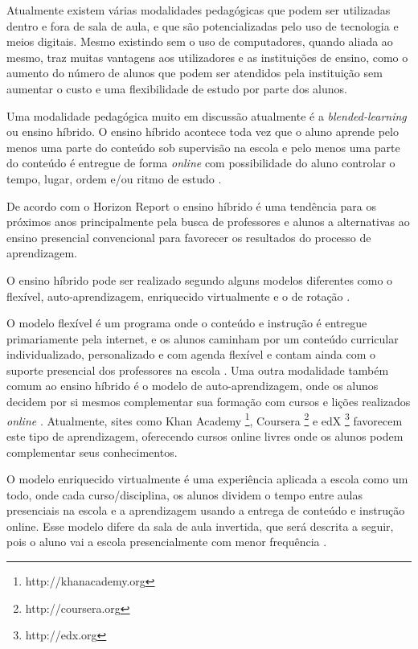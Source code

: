 Atualmente existem várias modalidades pedagógicas que podem ser utilizadas dentro e fora de sala de aula, e que são potencializadas pelo uso de tecnologia e meios digitais. Mesmo existindo sem o uso de computadores, quando aliada ao mesmo, traz muitas vantagens aos utilizadores e as instituições de ensino, como o aumento do número de alunos que podem ser atendidos pela instituição sem aumentar o custo e uma flexibilidade de estudo por parte dos alunos. 

Uma modalidade pedagógica muito em discussão atualmente é a \emph{blended-learning} ou ensino híbrido. O ensino híbrido acontece toda vez que o aluno aprende pelo menos uma parte do conteúdo sob supervisão na escola e pelo menos uma parte do conteúdo é entregue de forma \emph{online} com possibilidade do aluno controlar o tempo, lugar, ordem e/ou ritmo de estudo \cite{horn_rise_2011}.

De acordo com o Horizon Report \cite{horizon_report_he_2015} o ensino híbrido é uma tendência para os próximos anos principalmente pela busca de professores e alunos a alternativas ao ensino presencial convencional para favorecer os resultados do processo de aprendizagem.

O ensino híbrido pode ser realizado segundo alguns modelos diferentes como o flexível, auto-aprendizagem, enriquecido virtualmente e o de rotação \cite{staker_classifying_2012}.


O modelo flexível é um programa onde o conteúdo e instrução é entregue primariamente pela internet, e os alunos caminham por um conteúdo curricular individualizado, personalizado e com agenda flexível e contam ainda com o suporte presencial dos professores na escola \cite{staker_classifying_2012}. Uma outra modalidade também comum ao ensino híbrido é o modelo de auto-aprendizagem, onde os alunos decidem por si mesmos complementar sua formação com cursos e lições realizados \emph{online} \cite{horn_rise_2011}. Atualmente, sites como Khan Academy \footnote{http://khanacademy.org}, Coursera \footnote{http://coursera.org} e edX \footnote{http://edx.org} favorecem este tipo de aprendizagem, oferecendo cursos online livres onde os alunos podem complementar seus conhecimentos.

O modelo enriquecido virtualmente é uma experiência aplicada a escola como um todo, onde cada curso/disciplina, os alunos dividem o tempo entre aulas presenciais na escola e a aprendizagem usando a entrega de conteúdo e instrução online. Esse modelo difere da sala de aula invertida, que será descrita a seguir, pois o aluno vai a escola presencialmente com menor frequência \cite{staker_classifying_2012}.

